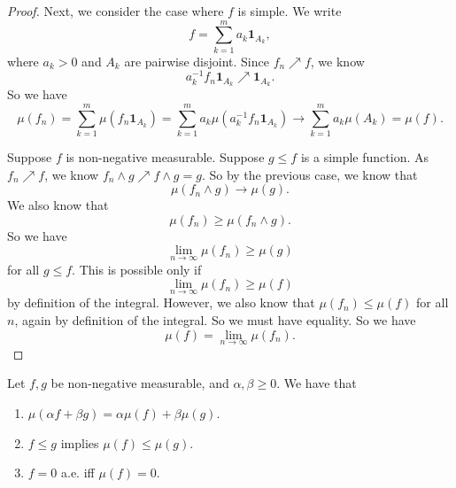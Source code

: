 \documentclass[a4paper]{article}
\begin{document}
\begin{proof}
  Next, we consider the case where $f$ is simple. We write
  \[
    f = \sum_{k = 1}^m a_k \mathbf{1}_{A_k},
  \]
  where $a_k > 0$ and $A_k$ are pairwise disjoint. Since $f_n \nearrow f$, we know
  \[
    a_k^{-1} f_n \mathbf{1}_{A_k} \nearrow \mathbf{1}_{A_k}.
  \]
  So we have
  \[
    \mu(f_n) = \sum_{k = 1}^m \mu(f_n \mathbf{1}_{A_k}) = \sum_{k = 1}^m a_k \mu(a_k^{-1} f_n \mathbf{1}_{A_k}) \to \sum_{k = 1}^m a_k \mu(A_k) = \mu(f).
  \]

  \separator

  Suppose $f$ is non-negative measurable. Suppose $g \leq f$ is a simple function. As $f_n \nearrow f$, we know $f_n \wedge g \nearrow f \wedge g = g$. So by the previous case, we know that
  \[
    \mu(f_n \wedge g) \to \mu(g).
  \]
  We also know that
  \[
    \mu(f_n) \geq \mu(f_n\wedge g).
  \]
  So we have
  \[
    \lim_{n \to \infty} \mu(f_n) \geq \mu(g)
  \]
  for all $g \leq f$. This is possible only if
  \[
    \lim_{n \to \infty} \mu(f_n) \geq \mu(f)
  \]
  by definition of the integral. However, we also know that $\mu(f_n) \leq \mu(f)$ for all $n$, again by definition of the integral. So we must have equality. So we have
  \[
    \mu(f) = \lim_{n \to \infty} \mu(f_n).
  \]
\end{proof}

\begin{thm}
  Let $f, g$ be non-negative measurable, and $\alpha, \beta \geq 0$. We have that
  \begin{enumerate}
    \item $\mu(\alpha f + \beta g) = \alpha \mu(f) + \beta \mu(g)$.
    \item $f \leq g$ implies $\mu(f) \leq \mu(g)$.
    \item $f = 0$ a.e. iff $\mu(f) = 0$.
  \end{enumerate}
\end{thm}
\end{document}
